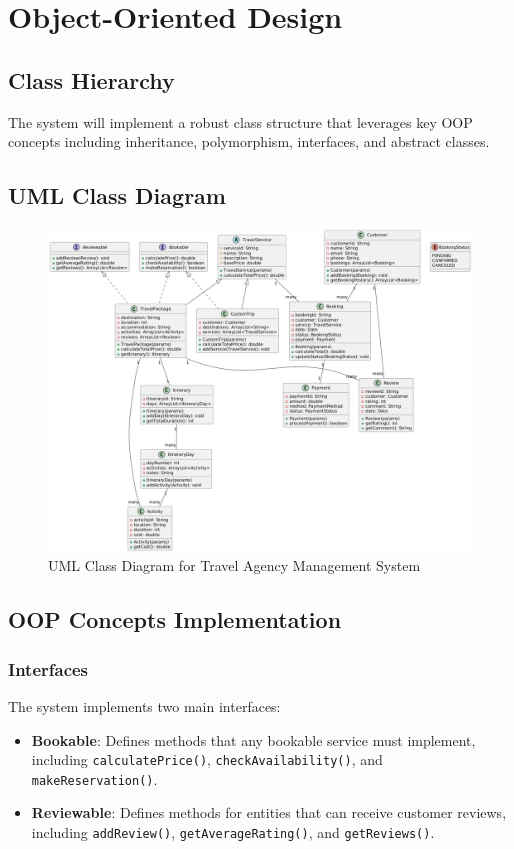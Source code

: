 \documentclass[12pt]{article}
\begin{document}
\section{Object-Oriented Design}

\subsection{Class Hierarchy}
The system will implement a robust class structure that leverages key OOP concepts including inheritance, polymorphism, interfaces, and abstract classes.

\subsection{UML Class Diagram}

\begin{figure}[H]
\centering
\includegraphics[width=\textwidth]{uml1.png}
\caption{UML Class Diagram for Travel Agency Management System}
\end{figure}
\newpage

\subsection{OOP Concepts Implementation}

\subsubsection{Interfaces}
The system implements two main interfaces:

\begin{itemize}
    \item \textbf{Bookable}: Defines methods that any bookable service must implement, including \texttt{calculatePrice()}, \texttt{checkAvailability()}, and \texttt{makeReservation()}.
    
    \item \textbf{Reviewable}: Defines methods for entities that can receive customer reviews, including \texttt{addReview()}, \texttt{getAverageRating()}, and \texttt{getReviews()}.
\end{itemize}
\end{document}
